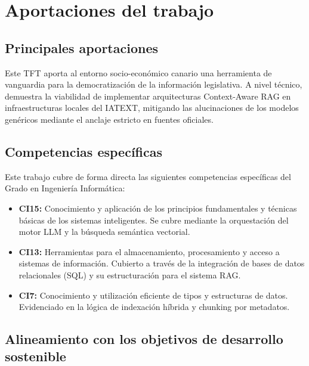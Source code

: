 \documentclass[oneside,12pt]{book}
\begin{document}
\chapter{Aportaciones del trabajo}
%

\section{Principales aportaciones}
Este TFT aporta al entorno socio-económico canario una herramienta de vanguardia para la democratización de la información legislativa. A nivel técnico, demuestra la viabilidad de implementar arquitecturas Context-Aware RAG en infraestructuras locales del IATEXT, mitigando las alucinaciones de los modelos genéricos mediante el anclaje estricto en fuentes oficiales.

\section{Competencias específicas}
Este trabajo cubre de forma directa las siguientes competencias específicas del Grado en Ingeniería Informática:
\begin{itemize}
    \item \textbf{CI15:} Conocimiento y aplicación de los principios fundamentales y técnicas básicas de los sistemas inteligentes. Se cubre mediante la orquestación del motor LLM y la búsqueda semántica vectorial.
    \item \textbf{CI13:} Herramientas para el almacenamiento, procesamiento y acceso a sistemas de información. Cubierto a través de la integración de bases de datos relacionales (SQL) y su estructuración para el sistema RAG.
    \item \textbf{CI7:} Conocimiento y utilización eficiente de tipos y estructuras de datos. Evidenciado en la lógica de indexación híbrida y chunking por metadatos.
\end{itemize}

\section{Alineamiento con los objetivos de desarrollo sostenible}
\end{document}
